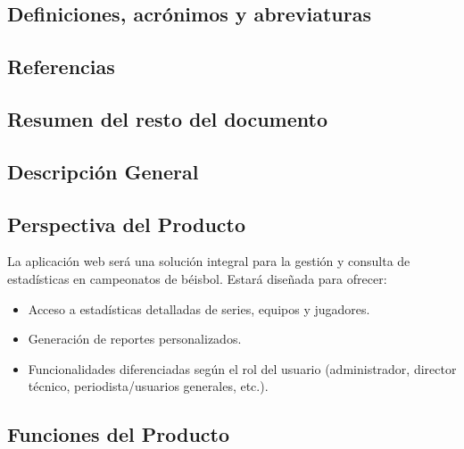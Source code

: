 \documentclass{report}
\begin{document}
        \subsection*{Definiciones, acrónimos y abreviaturas}

        \subsection*{Referencias}

        \subsection*{Resumen del resto del documento}


    \newpage

    \begin{center}
        \section*{Descripción General}
    \end{center}

        \subsection*{Perspectiva del Producto}
        La aplicación web será una solución integral para la gestión y consulta de estadísticas en campeonatos de 
        béisbol. Estará diseñada para ofrecer:
        \begin{itemize}
            \item Acceso a estadísticas detalladas de series, equipos y jugadores.
            \item Generación de reportes personalizados.
            \item Funcionalidades diferenciadas según el rol del usuario (administrador, director técnico, 
            periodista/usuarios generales, etc.).
        \end{itemize}

        \subsection*{Funciones del Producto}
        
\end{document}
